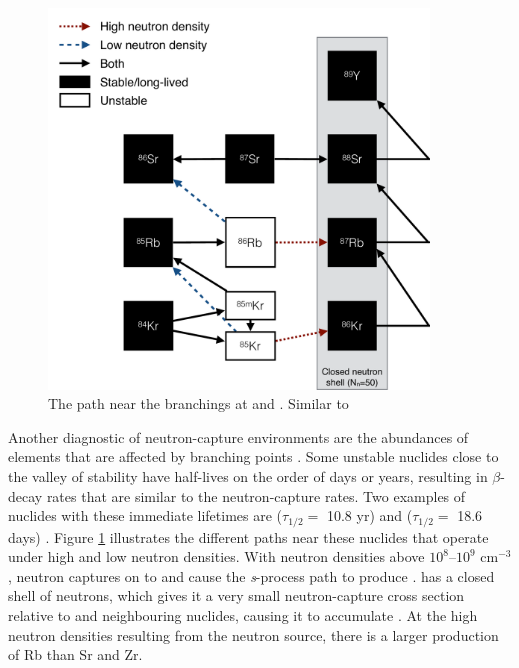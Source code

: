 \begin{figure}
 \begin{center}\includegraphics[width=0.9\textwidth]{fig-sprocessbranching}\end{center}
 \caption{The \sprocess path near the branchings at  and . Similar to \citet[][Figure 1]{vanRaai:2012fq}}\label{fig:sprocessbranching}
\end{figure}

Another diagnostic of neutron-capture environments are the abundances of elements that are affected by \sprocess branching points \citep{Ward:1976ji}. Some unstable nuclides close to the valley of stability have half-lives on the order of days or years, resulting in $\beta$-decay rates that are similar to the neutron-capture rates. Two examples of nuclides with these immediate lifetimes are  ($\tau_{1/2}=$ 10.8 yr) and  ($\tau_{1/2}=$ 18.6 days) \citep{vanRaai:2012fq,Karakas:2012kc}. Figure \ref{fig:sprocessbranching} illustrates the different \sprocess paths near these nuclides that operate under high and low neutron densities. With neutron densities above $10^8$--$10^9$ cm$^\mathrm{-3}$, neutron captures on to  and  cause the \textit{s}-process path to produce .  has a closed shell of neutrons, which gives it a very small neutron-capture cross section relative to  and neighbouring nuclides, causing it to accumulate \citep{Heil:2008kl}. At the high neutron densities resulting from the  neutron source, there is a larger production of Rb than Sr and Zr.

